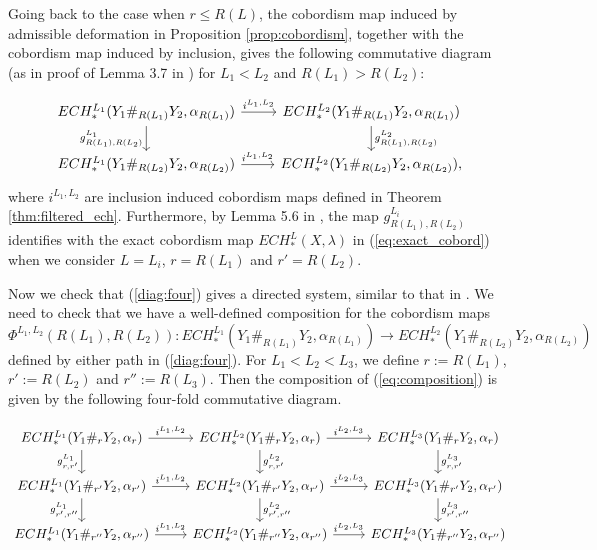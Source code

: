 \documentclass{article}
\numberwithin{equation}{section}
\theoremstyle{definition}
\begin{document}
Going back to the case when $r\leq R(L)$, the cobordism map induced by admissible deformation in Proposition \ref{prop:cobordism}, together with the cobordism map induced by inclusion, gives the following commutative diagram (as in proof of Lemma 3.7 in \cite{HT_Chord_II}) for $L_1<L_2$ and $R(L_1)>R(L_2)$:


\begin{equation}
\label{diag:four}
\begin{tikzcd}
ECH_*^{L_1}(Y_1\#_{R(L_1)} Y_2 , \alpha_{R(L_1)}) \arrow{r}{i^{L_1, L_2}} \arrow[swap]{d}{g_{R(L_1),R(L_2)}^{L_1}} & ECH_*^{L_2}(Y_1\#_{R(L_1)} Y_2 , \alpha_{R(L_1)}) \arrow{d}{g_{R(L_1),R(L_2)}^{L_2}} \\%
ECH_*^{L_1}(Y_1\#_{R(L_2)} Y_2 , \alpha_{R(L_2)}) \arrow{r}{i^{L_1, L_2}}& ECH_*^{L_2}(Y_1\#_{R(L_2)} Y_2, \alpha_{R(L_2)}),
\end{tikzcd}
\end{equation}
where $i^{L_1, L_2}$ are inclusion induced cobordism maps defined in Theorem \ref{thm:filtered_ech}. 
Furthermore, by Lemma 5.6 in \cite{HT_Chord_II}, the map $g_{R(L_1),R(L_2)}^{L_i}$ identifies with the exact cobordism map $ECH_*^L(X, \lambda)$ in (\ref{eq:exact_cobord}) when we consider $L = L_i$, $r = R(L_1)$ and $r' = R(L_2)$. 


Now we check that (\ref{diag:four}) gives a directed system, similar to that in \cite{Nelson_Morgan}. We need to check that we have a well-defined composition for the cobordism maps
\begin{equation}
\label{eq:composition}
    \Phi^{L_1, L_2}(R(L_1),R(L_2)):ECH_*^{L_1}(Y_1\#_{R(L_1)} Y_2 , \alpha_{R(L_1)}) \to ECH_*^{L_2}(Y_1\#_{R(L_2)} Y_2 , \alpha_{R(L_2)})
\end{equation}
defined by either path in (\ref{diag:four}). For $L_1<L_2<L_3$, we define $r:=R(L_1)$, $r':=R(L_2)$ and $r'':=R(L_3)$. Then the composition of (\ref{eq:composition}) is given by the following four-fold commutative diagram.




\[ \begin{tikzcd}
ECH_*^{L_1}(Y_1\#_{r} Y_2 , \alpha_{r}) \arrow{r}{i^{L_1, L_2}} \arrow[swap]{d}{g_{r,r'}^{L_1}} 
& ECH_*^{L_2}(Y_1\#_{r} Y_2 , \alpha_{r}) \arrow{r}{i^{L_2, L_3}} \arrow{d}{g_{r,r'}^{L_2}} 
& ECH_*^{L_3}(Y_1\#_{r} Y_2 , \alpha_{r}) \arrow{d}{g_{r,r'}^{L_3}} \\%
ECH_*^{L_1}(Y_1\#_{r'} Y_2 , \alpha_{r'}) \arrow{r}{i^{L_1, L_2}}
\arrow[swap]{d}{g_{r',r''}^{L_1}} 
& ECH_*^{L_2}(Y_1\#_{r'} Y_2 , \alpha_{r'}) \arrow{r}{i^{L_2, L_3}} \arrow{d}{g_{r',r''}^{L_2}} 
& ECH_*^{L_3}(Y_1\#_{r'} Y_2 , \alpha_{r'}) \arrow{d}{g_{r',r''}^{L_3}} \\%
ECH_*^{L_1}(Y_1\#_{r''} Y_2 , \alpha_{r''}) \arrow{r}{i^{L_1, L_2}}
& ECH_*^{L_2}(Y_1\#_{r''} Y_2 , \alpha_{r''}) \arrow{r}{i^{L_2, L_3}} 
& ECH_*^{L_3}(Y_1\#_{r''} Y_2 , \alpha_{r''}) 
\end{tikzcd}
\]
\end{document}
